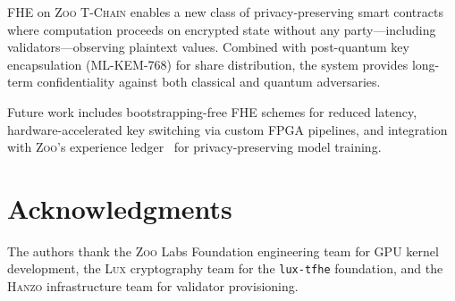 \documentclass[11pt,letterpaper]{article}
\theoremstyle{definition}
\theoremstyle{remark}
\newcommand{\Zoo}{\textsc{Zoo}}
\newcommand{\Hanzo}{\textsc{Hanzo}}
\newcommand{\Lux}{\textsc{Lux}}
\newcommand{\TChain}{\textsc{T-Chain}}
\newcommand{\MLKEM}{\textsc{ML-KEM}}
\begin{document}
FHE on \Zoo{} \TChain{} enables a new class of privacy-preserving smart contracts where computation proceeds on encrypted state without any party---including validators---observing plaintext values. Combined with post-quantum key encapsulation (\MLKEM{}-768) for share distribution, the system provides long-term confidentiality against both classical and quantum adversaries.

Future work includes bootstrapping-free FHE schemes for reduced latency, hardware-accelerated key switching via custom FPGA pipelines, and integration with \Zoo{}'s experience ledger~\cite{zoo-tokenomics} for privacy-preserving model training.

\section*{Acknowledgments}

The authors thank the \Zoo{} Labs Foundation engineering team for GPU kernel development, the \Lux{} cryptography team for the \texttt{lux-tfhe} foundation, and the \Hanzo{} infrastructure team for validator provisioning.
\end{document}
